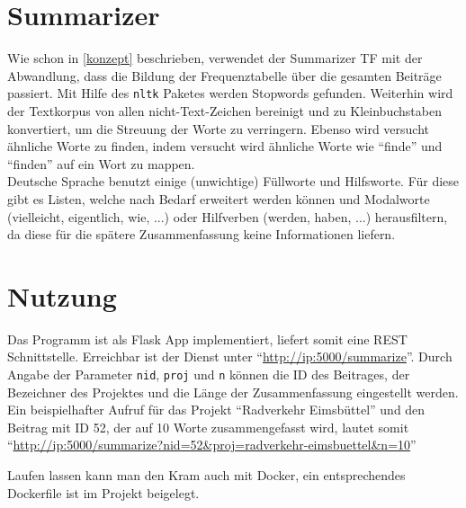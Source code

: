 \documentclass[10pt,a4paper]{article}
\begin{document}
\section{Summarizer}
Wie schon in \ref{konzept} beschrieben, verwendet der Summarizer TF mit der Abwandlung, dass die Bildung der Frequenztabelle über die gesamten Beiträge passiert. Mit Hilfe des \texttt{nltk} Paketes werden Stopwords gefunden. Weiterhin wird der Textkorpus von allen nicht-Text-Zeichen bereinigt und zu Kleinbuchstaben konvertiert, um die Streuung der Worte zu verringern. Ebenso wird versucht ähnliche Worte zu finden, indem versucht wird ähnliche Worte wie \enquote{finde} und \enquote{finden} auf ein Wort zu mappen.\\
Deutsche Sprache benutzt einige (unwichtige) Füllworte und Hilfsworte. Für diese gibt es Listen, welche nach Bedarf erweitert werden können und Modalworte (vielleicht, eigentlich, wie, ...) oder Hilfverben (werden, haben, ...) herausfiltern, da diese für die spätere Zusammenfassung keine Informationen liefern.

\section{Nutzung}
Das Programm ist als Flask App implementiert, liefert somit eine REST Schnittstelle. Erreichbar ist der Dienst unter \enquote{\url{http://ip:5000/summarize}}. Durch Angabe der Parameter \texttt{nid}, \texttt{proj} und \texttt{n} können die ID des Beitrages, der Bezeichner des Projektes und die Länge der Zusammenfassung eingestellt werden. Ein beispielhafter Aufruf für das Projekt \enquote{Radverkehr Eimsbüttel} und den Beitrag mit ID 52, der auf 10 Worte zusammengefasst wird, lautet somit \enquote{\url{http://ip:5000/summarize?nid=52&proj=radverkehr-eimsbuettel&n=10}}

Laufen lassen kann man den Kram auch mit Docker, ein entsprechendes Dockerfile ist im Projekt beigelegt.
\end{document}
